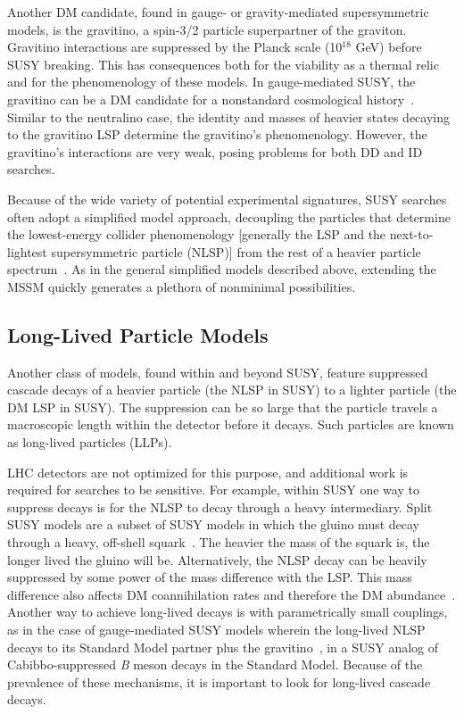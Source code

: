 \documentclass{ar-1col}
\begin{document}
{Another DM candidate, found in gauge- or gravity-mediated supersymmetric
models, is the gravitino, a spin-3/2 particle superpartner of the
graviton. Gravitino interactions are suppressed by the Planck
scale (10$^{18}$ GeV) before SUSY breaking. This has consequences
both for the viability as a thermal relic and for the
phenomenology of these models. In gauge-mediated SUSY, the gravitino can be a DM
candidate for a nonstandard cosmological
history~\cite{Dimopoulos:1996vz}. Similar to the neutralino case,
the identity and masses of heavier states decaying to the
gravitino LSP determine the gravitino's phenomenology. However, the gravitino's
interactions are very weak, posing problems for both DD and
ID searches.

Because of the wide variety of potential experimental signatures,
SUSY searches often adopt a simplified model approach,
decoupling the particles that determine the lowest-energy collider
phenomenology [generally the LSP and the next-to-lightest supersymmetric particle (NLSP)] from the rest of a heavier
particle spectrum~\cite{Alves:2011wf}. 
As in the general simplified models described above, extending the MSSM quickly
generates a plethora of nonminimal possibilities.

\subsection{Long-Lived Particle Models}\label{sec:LLPModels}

Another class of models, found within and beyond SUSY, feature suppressed cascade decays of a heavier particle (the NLSP
in SUSY) to a lighter particle (the DM LSP in SUSY). The
suppression can be so large that the particle travels a
macroscopic length within the detector before it decays. Such particles are known as long-lived particles (LLPs).

LHC detectors are not optimized for this purpose, and additional work is required
for searches to be sensitive. 
For example, within SUSY one way to suppress decays is for the NLSP to decay
through a heavy intermediary. Split SUSY models are a
subset of SUSY models in which the gluino must decay through a heavy,
off-shell squark~\cite{Masiero:2004ft}. The heavier the mass of
the squark is, the longer lived the gluino will be. Alternatively, the NLSP
decay can be heavily suppressed by some power of the mass
difference with the LSP. This mass difference also affects DM
coannihilation rates and therefore the DM
abundance~\cite{Ellis:1999mm}. Another way to achieve
long-lived decays is with parametrically small couplings, as in
the case of gauge-mediated SUSY models wherein the
long-lived NLSP decays to its Standard Model partner plus the
gravitino~\cite{Dimopoulos:1996vz}, in a SUSY analog of Cabibbo-suppressed \textit{B} meson decays in the Standard Model. Because of the prevalence of
these mechanisms, it is important to look for long-lived cascade
decays.

}
\end{document}
